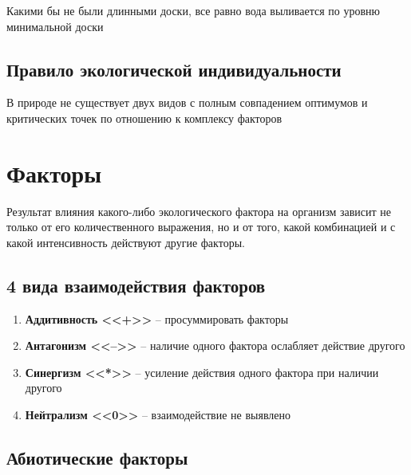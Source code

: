 Какими бы не были длинными доски, все равно вода выливается по
уровню минимальной доски

\subsection{Правило экологической индивидуальности}

В природе не существует двух видов с полным совпадением оптимумов
и критических точек по отношению к комплексу факторов

\section{Факторы}

Результат влияния какого-либо экологического фактора на организм
зависит не только от его количественного выражения, но и от того,
какой комбинацией и с какой интенсивность действуют другие факторы.

\subsection{4 вида взаимодействия факторов}

\begin{enumerate}
    \item \textbf{Аддитивность <<+>>} --
        просуммировать факторы
    \item \textbf{Антагонизм <<-->>} --
        наличие одного фактора ослабляет действие другого
    \item \textbf{Синергизм <<*>>} --
        усиление действия одного фактора при наличии другого
    \item \textbf{Нейтрализм <<0>>} --
        взаимодействие не выявлено
\end{enumerate}

\subsection{Абиотические факторы}

